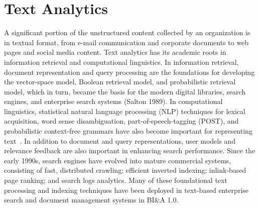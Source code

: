 \section{Text Analytics}

A significant portion of the unstructured content collected by
an organization is in textual format, from e-mail communication
and corporate documents to web pages and social
media content. Text analytics has its academic roots in
information retrieval and computational linguistics. In information
retrieval, document representation and query processing
are the foundations for developing the vector-space
model, Boolean retrieval model, and probabilistic retrieval
model, which in turn, became the basis for the modern digital
libraries, search engines, and enterprise search systems
(Salton 1989). In computational linguistics, statistical natural
language processing (NLP) techniques for lexical acquisition,
word sense disambiguation, part-of-speech-tagging (POST),
and probabilistic context-free grammars have also become
important for representing text~\cite{Manning:1999}.
In addition to document and query representations, user
models and relevance feedback are also important in
enhancing search performance.
Since the early 1990s, search engines have evolved into
mature commercial systems, consisting of fast, distributed
crawling; efficient inverted indexing; inlink-based page
ranking; and search logs analytics. Many of these foundational
text processing and indexing techniques have been
deployed in text-based enterprise search and document
management systems in BI\&A 1.0.

